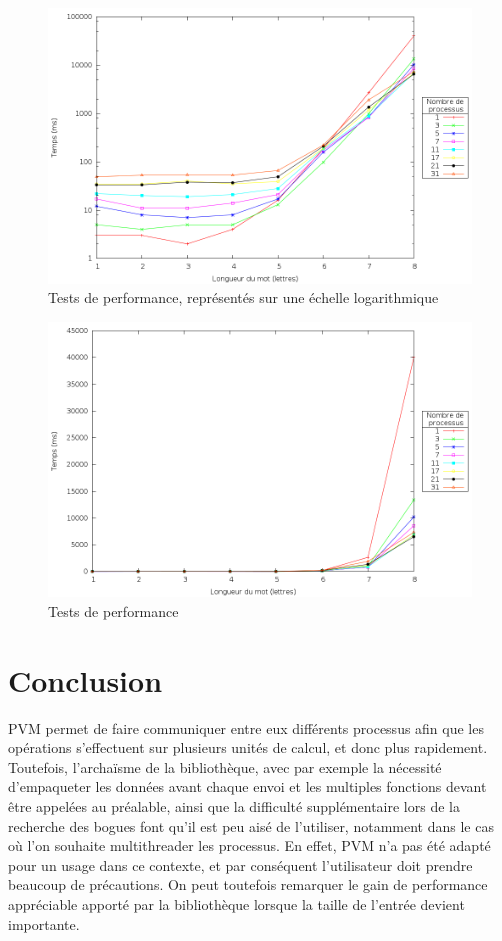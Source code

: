 \documentclass[a4paper,11pt]{article}
\begin{document}
\begin{figure}[h!]
  \centering
  \includegraphics[width=\textwidth]{plot_log.png}
  \caption{Tests de performance, représentés sur une échelle logarithmique}
  \label{perf_loga}
\end{figure}

\begin{figure}[h!]
  \centering
  \includegraphics[width=\textwidth]{plot.png}
  \caption{Tests de performance}
  \label{perf}
\end{figure}

\section{Conclusion}

PVM permet de faire communiquer entre eux différents processus afin que les opérations s'effectuent sur plusieurs unités de calcul, et donc plus rapidement. Toutefois, l'archaïsme de la bibliothèque, avec par exemple la nécessité d'empaqueter les données avant chaque envoi et les multiples fonctions devant être appelées au préalable, ainsi que la difficulté supplémentaire lors de la recherche des bogues font qu'il est peu aisé de l'utiliser, notamment dans le cas où l'on souhaite multithreader les processus. En effet, PVM n'a pas été adapté pour un usage dans ce contexte, et par conséquent l'utilisateur doit prendre beaucoup de précautions. On peut toutefois remarquer le gain de performance appréciable apporté par la bibliothèque lorsque la taille de l'entrée devient importante. 
\end{document}
